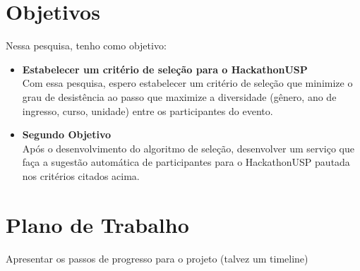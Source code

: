 \documentclass[10pt,twoside,a4paper]{article}
\begin{document}
\section{Objetivos}

    Nessa pesquisa, tenho como objetivo:
    \begin{itemize}
      \item \textbf{Estabelecer um critério de seleção para o  HackathonUSP}\\
        Com essa pesquisa, espero estabelecer um critério de seleção que minimize o grau de desistência ao passo que maximize a diversidade (gênero, ano de ingresso, curso, unidade) entre os participantes do evento.

      \item \textbf{Segundo Objetivo}\\
        Após o desenvolvimento do algoritmo de seleção, desenvolver um serviço que faça a sugestão automática de participantes para o HackathonUSP pautada nos critérios citados acima.
    \end{itemize}
    
\section{Plano de Trabalho}
  
  Apresentar os passos de progresso para o projeto (talvez um timeline)
\end{document}
